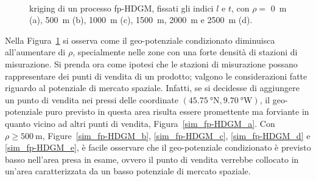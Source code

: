 \begin{figure}[htbp]
	\
	\caption[Kriging di un processo fp-HDGM al variare di $\rho$]{kriging di un processo fp-HDGM, fissati gli indici $l$ e $t$, con $\rho=$ \SI{0}{\meter} (a), \SI{500}{\meter} (b), \SI{1000}{\meter} (c), \SI{1500}{\meter}, \SI{2000}{\meter} e \SI{2500}{\meter} (d).}
	\label{sim_fp-HDGM}
\end{figure}
Nella Figura~\ref{sim_fp-HDGM} si osserva come il geo-potenziale condizionato diminuisca all'aumentare di $\rho$, specialmente nelle zone con una forte densità di stazioni di misurazione. Si prenda ora come ipotesi che le stazioni di misurazione possano rappresentare dei punti di vendita di un prodotto; valgono le considerazioni fatte riguardo al potenziale di mercato spaziale. Infatti, se si decidesse di aggiungere un punto di vendita nei pressi delle coordinate $(\SI{45.75}{\degree} \text{N}, \SI{9.70}{\degree} \text{W})$, il geo-potenziale puro previsto in questa area risulta essere promettente ma forviante in quanto vicino ad altri punti di vendita, Figura~\ref{sim_fp-HDGM_a}. Con $\rho \geq \SI{500}{\meter}$, Figure~\ref{sim_fp-HDGM_b}, \ref{sim_fp-HDGM_c},  \ref{sim_fp-HDGM_d} e \ref{sim_fp-HDGM_e}, è facile osservare che il geo-potenziale condizionato è previsto basso nell'area presa in esame, ovvero il punto di vendita verrebbe collocato in un'area caratterizzata da un basso potenziale di mercato spaziale.